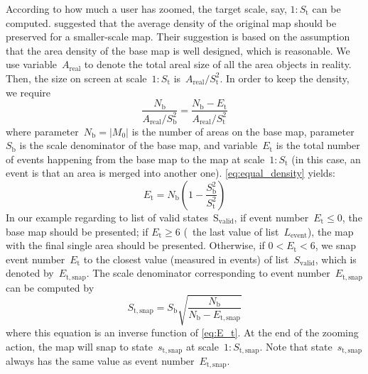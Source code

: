 \documentclass[twocolumn]{svjour3}          %
\begin{document}
According to how much a user has zoomed,
the target scale, say, $1:S_\mathrm{t}$ can be computed.
\citet{Huang2016Webmap} suggested that 
the average density of the original map should be preserved 
for a smaller-scale map.
Their suggestion is based on the assumption that 
the area density of the base map is well designed, which is reasonable.
We use variable~$A_\mathrm{real}$ to denote the total areal size of 
all the area objects in reality.
Then, the size on screen at scale~$1:S_\mathrm{t}$ 
is~$A_\mathrm{real} \big/ S^2_\mathrm{t}$.
In order to keep the density, we require
\begin{equation}
\label{eq:equal_density}
\frac{N_\mathrm{b}}{A_\mathrm{real} \big/ S^2_\mathrm{b}} =
\frac{N_\mathrm{b}-E_\mathrm{t}}{A_\mathrm{real} \big/ S^2_\mathrm{t}}
\end{equation}
where parameter~$N_\mathrm{b} = |M_0|$ 
is the number of areas on the base map,
parameter~$S_\mathrm{b}$ is the scale denominator of the base map,
and variable~$E_\mathrm{t}$ is the total number of events 
happening from the base map to the map at scale~$1:S_\mathrm{t}$
(in this case, an event is that an area is merged into another one).
\eq\ref{eq:equal_density} yields:
\begin{equation}
\label{eq:E_t}
E_\mathrm{t} = N_\mathrm{b} \left(1-\frac{S^2_\mathrm{b}}{S^2_\mathrm{t}}\right)
\end{equation}
In our example regarding to list of valid states~$\mathrm{S_\mathrm{valid}}$,
if event number~$E_\mathrm{t} \le 0$, the base map should be presented;
if $E_\mathrm{t} \ge 6$ (\ie~the last value of list~$L_\mathrm{event}$),
the map with the final single area should be presented.
Otherwise, if $0<E_\mathrm{t} < 6$, we snap event number~$E_\mathrm{t}$ 
to the closest value (measured in events) of list~$S_\mathrm{valid}$,
which is denoted by~$E_\mathrm{t,snap}$.
The scale denominator corresponding to event number~$E_\mathrm{t,snap}$
can be computed by 
\begin{equation}
\label{eq:S_t_snap}
S_\mathrm{t,snap} = S_\mathrm{b} \sqrt{\frac{N_\mathrm{b}}{N_\mathrm{b}-E_\mathrm{t,snap}}}
\end{equation}
where this equation is an inverse function of \eq\ref{eq:E_t}.
At the end of the zooming action, 
the map will snap to state~$s_\mathrm{t,snap}$
at scale~$1:S_\mathrm{t,snap}$.
Note that state~$s_\mathrm{t,snap}$ always has 
the same value as event number~$E_\mathrm{t,snap}$.
\end{document}
